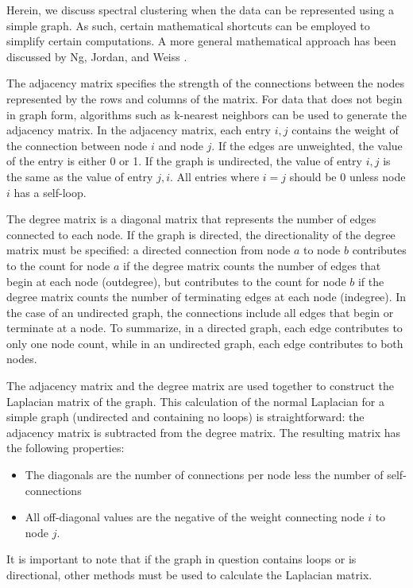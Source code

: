 Herein, we discuss spectral clustering when the data can be represented using a simple graph. As such, certain mathematical shortcuts can be employed to simplify certain computations. A more general mathematical approach has been discussed by Ng, Jordan, and Weiss \cite{Ng2002}.

The adjacency matrix specifies the strength of the connections between the nodes represented by the rows and columns of the matrix. For data that does not begin in graph form, algorithms such as k-nearest neighbors can be used to generate the adjacency matrix. In the adjacency matrix, each entry $i, j$ contains the weight of the connection between node $i$ and node $j$. If the edges are unweighted, the value of the entry is either 0 or 1. If the graph is undirected, the value of entry $i, j$ is the same as the value of entry $j, i$. All entries where $i=j$ should be 0 unless node $i$ has a self-loop.

The degree matrix is a diagonal matrix that represents the number of edges connected to each node. If the graph is directed, the directionality of the degree matrix must be specified: a directed connection from node $a$ to node $b$ contributes to the count for node $a$ if the degree matrix counts the number of edges that begin at each node (outdegree), but contributes to the count for node $b$ if the degree matrix counts the number of terminating edges at each node (indegree). In the case of an undirected graph, the connections include all edges that begin or terminate at a node. To summarize, in a directed graph, each edge contributes to only one node count, while in an undirected graph, each edge contributes to both nodes.

The adjacency matrix and the degree matrix are used together to construct the Laplacian matrix of the graph. This calculation of the normal Laplacian for a simple graph (undirected and containing no loops) is straightforward: the adjacency matrix is subtracted from the degree matrix. The resulting matrix has the following properties:
\begin{itemize}
\item The diagonals are the number of connections per node less the number of self-connections
\item All off-diagonal values are the negative of the weight connecting node $i$ to node $j$.
\end{itemize}
It is important to note that if the graph in question contains loops or is directional, other methods must be used to calculate the Laplacian matrix. 

